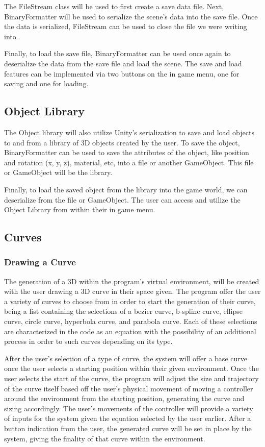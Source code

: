 \documentclass[draftclsnofoot,onecolumn,compsoc]{IEEEtran}
\begin{document}
The FileStream class will be used to first create a save data file. Next, BinaryFormatter will be used to serialize the scene’s data into the save file. Once the data is serialized, FileStream can be used to close the file we were writing into.. 

Finally, to load the save file, BinaryFormatter can be used once again to deserialize the data from the save file and load the scene. The save and load features can be implemented via two buttons on the in game menu, one for saving and one for loading.

\subsection{Object Library}
The Object library will also utilize Unity’s serialization to save and load objects to and from a library of 3D objects created by the user. To save the object, BinaryFormatter can be used to save the attributes of the object, like position and rotation (x, y, z), material, etc, into a file or another GameObject. This file or GameObject will be the library. 

Finally, to load the saved object from the library into the game world, we can deserialize from the file or GameObject. The user can access and utilize the Object Library from within their in game menu.

\subsection{Curves}
\subsubsection{Drawing a Curve}
	The generation of a 3D within the program’s virtual environment, will be created with the user drawing a 3D curve in their space given. The program offer the user a variety of curves to choose from in order to start the generation of their curve, being a list containing the selections of a bezier curve, b-spline curve, ellipse curve, circle curve, hyperbola curve, and parabola curve. Each of these selections are characterized in the code as an equation with the possibility of an additional process in order to such curves depending on its type.

    After the user’s selection of a type of curve, the system will offer a base curve once the user selects a starting position within their given environment. Once the user selects the start of the curve, the program will adjust the size and trajectory of the curve itself based off the user’s physical movement of moving a controller around the environment from the starting position, generating the curve and sizing accordingly. The user’s movements of the controller will provide a variety of inputs for the system given the equation selected by the user earlier. After a button indication from the user, the generated curve will be set in place by the system, giving the finality of that curve within the environment.
\end{document}

